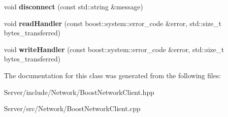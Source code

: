 \begin{DoxyCompactItemize}
void {\bfseries disconnect} (const std\+::string \&message)
\item 
\mbox{\label{classbbl_1_1srv_1_1_boost_network_client_a1712dcdcde5eb945e608a31d4d87f043}} 
void {\bfseries read\+Handler} (const boost\+::system\+::error\+\_\+code \&error, std\+::size\+\_\+t bytes\+\_\+transferred)
\item 
\mbox{\label{classbbl_1_1srv_1_1_boost_network_client_af279e06f5fccad98e4e3d122378e04ce}} 
void {\bfseries write\+Handler} (const boost\+::system\+::error\+\_\+code \&error, std\+::size\+\_\+t bytes\+\_\+transferred)
\end{DoxyCompactItemize}


The documentation for this class was generated from the following files\+:\begin{DoxyCompactItemize}
\item 
Server/include/\+Network/Boost\+Network\+Client.\+hpp\item 
Server/src/\+Network/Boost\+Network\+Client.\+cpp\end{DoxyCompactItemize}
